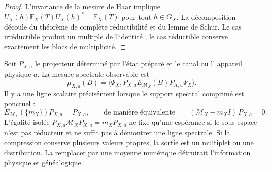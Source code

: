 \begin{proof}
L'invariance de la mesure de Haar implique
\(U_X(h)\mathbb E_X(T)U_X(h)^*=\mathbb E_X(T)\) pour tout \(h\in G_X\).
La décomposition découle du théorème de complète réductibilité et du lemme de
Schur. Le cas irréductible produit un multiple de l'identité ; le cas
réductible conserve exactement les blocs de multiplicité.
\end{proof}

Soit \(P_{X,a}\) le projecteur déterminé par l'état préparé et le canal ou l'
appareil physique \(a\). La mesure spectrale observable est
\[
 \mu_{X,a}(B)=
 \langle\Psi_X,
 P_{X,a}E_{\mathcal M_X}(B)P_{X,a}\Psi_X\rangle.
\]
Il y a une ligne scalaire précisément lorsque le support spectral comprimé est
ponctuel :
\[
 E_{\mathcal M_X}(\{m_X\})P_{X,a}=P_{X,a},
 \qquad\text{de manière équivalente}\qquad
 (\mathcal M_X-m_X I)\,P_{X,a}=0.
\]
L'égalité isolée
\(P_{X,a}\mathcal M_X P_{X,a}=m_X P_{X,a}\) ne fixe qu'une espérance si le
sous-espace n'est pas réducteur et ne suffit pas à démontrer une ligne spectrale.
Si la compression conserve plusieurs valeurs propres, la sortie est un multiplet ou une
distribution. La remplacer par une moyenne numérique détruirait l'information
physique et généalogique.



